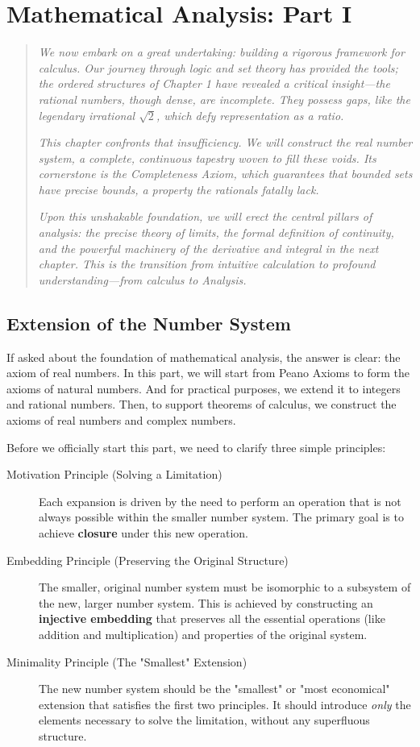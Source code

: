 \chapter{Mathematical Analysis: Part I}

\begin{quote}
\emph{
We now embark on a great undertaking: building a rigorous framework for calculus. Our journey through logic and set theory has provided the tools; the ordered structures of Chapter 1 have revealed a critical insight—the rational numbers, though dense, are incomplete. They possess gaps, like the legendary irrational $\sqrt{2}$, which defy representation as a ratio.
}

\emph{
This chapter confronts that insufficiency. We will construct the real number system, a complete, continuous tapestry woven to fill these voids. Its cornerstone is the Completeness Axiom, which guarantees that bounded sets have precise bounds, a property the rationals fatally lack.
}

\emph{
Upon this unshakable foundation, we will erect the central pillars of analysis: the precise theory of limits, the formal definition of continuity, and the powerful machinery of the derivative and integral in the next chapter. This is the transition from intuitive calculation to profound understanding—from calculus to Analysis.
}
\end{quote}

\section{Extension of the Number System}
If asked about the foundation of mathematical analysis, the answer is clear: the axiom of real numbers. In this part, we will start from Peano Axioms to form the axioms of natural numbers. And for practical purposes, we extend it to integers and rational numbers. Then, to support theorems of calculus, we construct the axioms of real numbers and complex numbers.

Before we officially start this part, we need to clarify three simple principles:
\begin{description}
    \item[Motivation Principle (Solving a Limitation)] Each expansion is driven by the need to perform an operation that is not always possible within the smaller number system. The primary goal is to achieve \textbf{closure} under this new operation.
    \item[Embedding Principle (Preserving the Original Structure)] The smaller, original number system must be isomorphic to a subsystem of the new, larger number system. This is achieved by constructing an \textbf{injective embedding} that preserves all the essential operations (like addition and multiplication) and properties of the original system.
    \item[Minimality Principle (The "Smallest" Extension)] The new number system should be the "smallest" or "most economical" extension that satisfies the first two principles. It should introduce \emph{only} the elements necessary to solve the limitation, without any superfluous structure.
\end{description}


